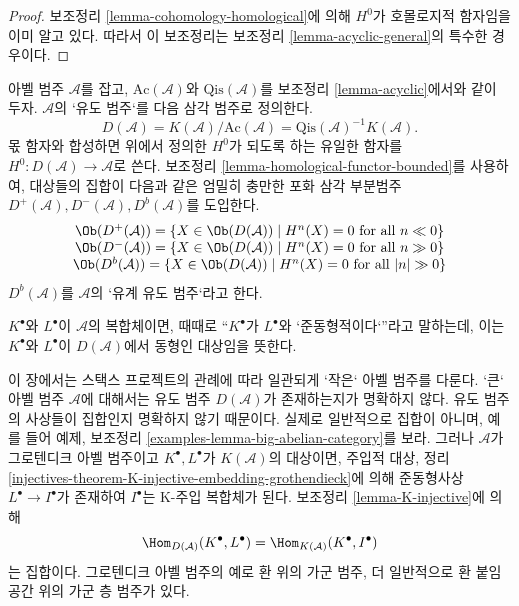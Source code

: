 \begin{proof}
보조정리 \ref{lemma-cohomology-homological}에 의해 $H^0$가 호몰로지적
함자임을 이미 알고 있다. 따라서 이 보조정리는 보조정리
\ref{lemma-acyclic-general}의 특수한 경우이다.
\end{proof}

\begin{definition}
\label{definition-unbounded-derived-category}
아벨 범주 $\mathcal{A}$를 잡고, $\text{Ac}(\mathcal{A})$와
$\text{Qis}(\mathcal{A})$를 보조정리 \ref{lemma-acyclic}에서와 같이
두자. $\mathcal{A}$의 {`}유도 범주{`}를 다음 삼각 범주로 정의한다.
$$
D(\mathcal{A}) =
K(\mathcal{A})/\text{Ac}(\mathcal{A}) =
\text{Qis}(\mathcal{A})^{-1} K(\mathcal{A}).
$$
몫 함자와 합성하면 위에서 정의한 $H^0$가 되도록 하는 유일한 함자를
$H^0 : D(\mathcal{A}) \to \mathcal{A}$로 쓴다. 보조정리
\ref{lemma-homological-functor-bounded}를 사용하여, 대상들의 집합이 다음과
같은 엄밀히 충만한 포화 삼각 부분범주
$D^{+}(\mathcal{A}), D^{-}(\mathcal{A}), D^b(\mathcal{A})$를 도입한다.
$$
\begin{matrix}
\Ob(D^{+}(\mathcal{A})) =
\{X \in \Ob(D(\mathcal{A})) \mid
H^n(X) = 0\text{ for all }n \ll 0\} \\
\Ob(D^{-}(\mathcal{A})) =
\{X \in \Ob(D(\mathcal{A})) \mid
H^n(X) = 0\text{ for all }n \gg 0\} \\
\Ob(D^b(\mathcal{A})) =
\{X \in \Ob(D(\mathcal{A})) \mid
H^n(X) = 0\text{ for all }|n| \gg 0\}
\end{matrix}
$$
$D^b(\mathcal{A})$를 $\mathcal{A}$의 {`}유계 유도 범주{`}라고 한다.
\end{definition}

\noindent
$K^\bullet$와 $L^\bullet$이 $\mathcal{A}$의 복합체이면, 때때로
“$K^\bullet$가 $L^\bullet$와 {`}준동형적이다{`}”라고 말하는데, 이는
$K^\bullet$와 $L^\bullet$이 $D(\mathcal{A})$에서 동형인 대상임을 뜻한다.

\begin{remark}
\label{remark-existence-derived}
이 장에서는 스택스 프로젝트의 관례에 따라 일관되게 {`}작은{`} 아벨
범주를 다룬다. {`}큰{`} 아벨 범주 $\mathcal{A}$에 대해서는 유도 범주
$D(\mathcal{A})$가 존재하는지가 명확하지 않다. 유도 범주의 사상들이 집합인지
명확하지 않기 때문이다. 실제로 일반적으로 집합이 아니며, 예를 들어
예제, 보조정리 \ref{examples-lemma-big-abelian-category}를 보라.
그러나 $\mathcal{A}$가 그로텐디크 아벨 범주이고
$K^\bullet, L^\bullet$가 $K(\mathcal{A})$의 대상이면, 주입적 대상,
정리 \ref{injectives-theorem-K-injective-embedding-grothendieck}에 의해
준동형사상 $L^\bullet \to I^\bullet$가 존재하여 $I^\bullet$는
K-주입 복합체가 된다. 보조정리 \ref{lemma-K-injective}에 의해
$$
\Hom_{D(\mathcal{A})}(K^\bullet, L^\bullet) =
\Hom_{K(\mathcal{A})}(K^\bullet, I^\bullet)
$$
는 집합이다. 그로텐디크 아벨 범주의 예로 환 위의 가군 범주, 더 일반적으로
환 붙임 공간 위의 가군 층 범주가 있다.
\end{remark}

